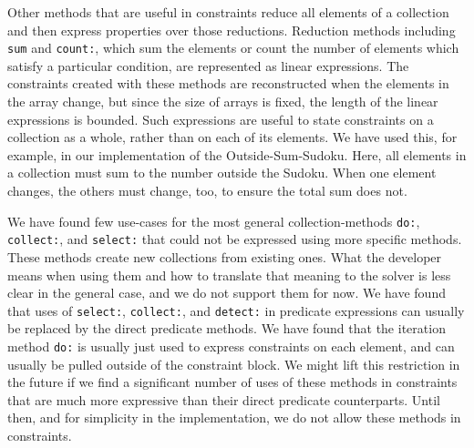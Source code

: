 Other methods that are useful in constraints reduce all elements of a
collection and then express properties over those
reductions. Reduction methods including \lstinline!sum! and
\lstinline!count:!, which sum the elements or count the number of
elements which satisfy a particular condition, are represented as
linear expressions. The constraints created with these methods are
reconstructed when the elements in the array change, but since the
size of arrays is fixed, the length of the linear expressions is
bounded. Such expressions are useful to state constraints on a
collection as a whole, rather than on each of its elements. We have
used this, for example, in our implementation of the
Outside-Sum-Sudoku. Here, all elements in a collection must sum to the
number outside the Sudoku. When one element changes, the others must
change, too, to ensure the total sum does not.

We have found few use-cases for the most general collection-methods
\lstinline!do:!, \lstinline!collect:!, and \lstinline!select:! that
could not be expressed using more specific methods. These methods
create new collections from existing ones. What the developer means
when using them and how to translate that meaning to the solver is
less clear in the general case, and we do not support them for now. We
have found that uses of \lstinline!select:!, \lstinline!collect:!, and
\lstinline!detect:! in predicate expressions can usually be replaced
by the direct predicate methods. We have found that the iteration
method \lstinline!do:! is usually just used to express constraints on
each element, and can usually be pulled outside of the constraint
block. We might lift this restriction in the future if we find a
significant number of uses of these methods in constraints that are
much more expressive than their direct predicate counterparts. Until
then, and for simplicity in the implementation, we do not allow these
methods in constraints.

